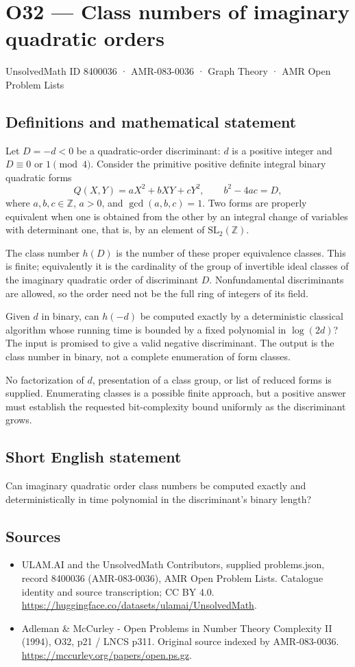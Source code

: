\documentclass[11pt,a4paper]{article}
\begin{document}
\section*{O32 — Class numbers of imaginary quadratic orders}\label{8400036}
{\small UnsolvedMath ID 8400036 · AMR-083-0036 · Graph Theory · AMR Open Problem Lists}
\subsection{Definitions and mathematical statement}
Let $D=-d<0$ be a quadratic-order discriminant: $d$ is a positive integer and $D\equiv0$ or $1\pmod4$. Consider the primitive positive definite integral binary quadratic forms
\[
Q(X,Y)=aX^2+bXY+cY^2,\qquad b^2-4ac=D,
\]
where $a,b,c\in\mathbb Z$, $a>0$, and $\gcd(a,b,c)=1$. Two forms are properly equivalent when one is obtained from the other by an integral change of variables with determinant one, that is, by an element of $\mathrm{SL}_2(\mathbb Z)$.

The class number $h(D)$ is the number of these proper equivalence classes. This is finite; equivalently it is the cardinality of the group of invertible ideal classes of the imaginary quadratic order of discriminant $D$. Nonfundamental discriminants are allowed, so the order need not be the full ring of integers of its field.

Given $d$ in binary, can $h(-d)$ be computed exactly by a deterministic classical algorithm whose running time is bounded by a fixed polynomial in $\log(2d)$? The input is promised to give a valid negative discriminant. The output is the class number in binary, not a complete enumeration of form classes.

No factorization of $d$, presentation of a class group, or list of reduced forms is supplied. Enumerating classes is a possible finite approach, but a positive answer must establish the requested bit-complexity bound uniformly as the discriminant grows.
\subsection{Short English statement}
Can imaginary quadratic order class numbers be computed exactly and deterministically in time polynomial in the discriminant’s binary length?
\subsection{Sources}
\begin{itemize}
\item[S1] ULAM.AI and the UnsolvedMath Contributors, supplied problems.json, record 8400036 (AMR-083-0036), AMR Open Problem Lists. Catalogue identity and source transcription; CC BY 4.0.
\url{https://huggingface.co/datasets/ulamai/UnsolvedMath}.
\item[S2] Adleman \& McCurley - Open Problems in Number Theory Complexity II (1994), O32, p21 / LNCS p311. Original source indexed by AMR-083-0036.
\url{https://mccurley.org/papers/open.ps.gz}.
\end{itemize}
\end{document}
